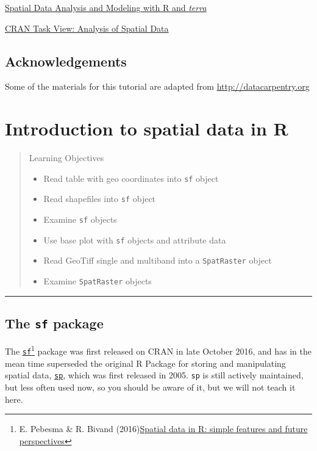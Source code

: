 \documentclass[
]{book}
\providecommand{\tightlist}{%
  \setlength{\itemsep}{0pt}\setlength{\parskip}{0pt}}
\begin{document}
\href{http://www.rspatial.org/index.html}{Spatial Data Analysis and Modeling with R and \emph{terra}}

\href{https://CRAN.R-project.org/view=Spatial}{CRAN Task View: Analysis of Spatial Data}

\hypertarget{acknowledgements}{%
\section*{Acknowledgements}\label{acknowledgements}}

Some of the materials for this tutorial are adapted from \url{http://datacarpentry.org}

\hypertarget{intro}{%
\chapter{Introduction to spatial data in R}\label{intro}}

\begin{quote}
Learning Objectives

\begin{itemize}
\tightlist
\item
  Read table with geo coordinates into \texttt{sf} object
\item
  Read shapefiles into \texttt{sf} object
\item
  Examine \texttt{sf} objects
\item
  Use base plot with \texttt{sf} objects and attribute data
\item
  Read GeoTiff single and multiband into a \texttt{SpatRaster} object
\item
  Examine \texttt{SpatRaster} objects
\end{itemize}
\end{quote}

\begin{center}\rule{0.5\linewidth}{0.5pt}\end{center}

\hypertarget{the-sf-package}{%
\section{\texorpdfstring{The \texttt{sf} package}{The sf package}}\label{the-sf-package}}

The \href{https://cran.r-project.org/package=sf}{\texttt{sf}}\footnote{E. Pebesma \& R. Bivand (2016)\href{http://pebesma.staff.ifgi.de/pebesma_sfr.pdf}{Spatial data in R: simple features and
  future perspectives}} package was first released on CRAN in late October 2016, and has in the mean time superseded the original R Package for storing and manipulating spatial data, \href{https://CRAN.R-project.org/package=sp}{\texttt{sp}}, which was first released in 2005. \texttt{sp} is still actively maintained, but less often used now, so you should be aware of it, but we will not teach it here.
\end{document}
